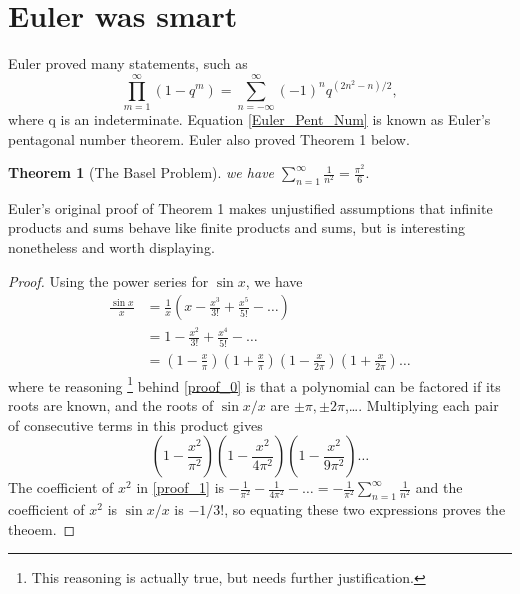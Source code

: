 \documentclass[10pt]{article}
\newtheorem{theorem}{Theorem}
\begin{document}
    \section{Euler was smart}
        Euler proved many statements, such as
        \begin{equation}
            \label{Euler_Pent_Num}
            \prod_{m=1}^{\infty}\left(1-q^m\right)=\sum_{n=-\infty}^{\infty}\left(-1\right)^n q^{\left(2n^2-n\right)/2},
        \end{equation}
        where q is an indeterminate. Equation \eqref{Euler_Pent_Num} is known as Euler's pentagonal number theorem.
        Euler also proved Theorem 1 below.
        \begin{theorem}[The Basel Problem]
            we have $\sum_{n=1}^{\infty}\frac{1}{n^2}=\frac{\pi^2}{6}.$
        \end{theorem}
        Euler’s original proof of Theorem 1 makes unjustified assumptions that infinite
        products and sums behave like finite products and sums, but is interesting
        nonetheless and worth displaying.
        \begin{proof}
            Using the power series for $\sin{x}$, we have
            \begin{align*}
                \frac{\sin x}{x} & = \frac{1}{x}\left(x - \frac{x^3}{3!}+\frac{x^5}{5!}-\ldots\right) \\
                                 & = 1 - \frac{x^2}{3!}+\frac{x^4}{5!}-\ldots \\
                                 \label{proof_0}
                                 \tag{2}
                                 & = \left(1-\frac{x}{\pi}\right) \left(1+\frac{x}{\pi}\right) \left(1-\frac{x}{2\pi}\right)\left(1+\frac{x}{2\pi}\right)\ldots
            \end{align*}
            where te reasoning \footnote{This reasoning is actually true, but needs further justification.}
            behind \eqref{proof_0} is that a polynomial can be factored if its roots
            are known, and the roots of $\sin x/x$ are $\pm\pi, \pm2\pi$,\ldots. Multiplying each pair
            of consecutive terms in this product gives
            \begin{equation*}
                \label{proof_1}
                \tag{3}
                \left(1-\frac{x^2}{\pi^2}\right) \left(1-\frac{x^2}{4\pi^2}\right) \left(1-\frac{x^2}{9\pi^2}\right)\ldots
            \end{equation*}
            The coefficient of $x^2$ in \eqref{proof_1} is $\displaystyle -\frac{1}{\pi^2}-\frac{1}{4\pi^2}-\ldots=-\frac{1}{\pi^2}\sum_{n=1}^{\infty}\frac{1}{n^2}$ and the
            coefficient of $x^2$ is $\sin x/x$ is $-1/3!$, so equating these two expressions proves the theoem.
        \end{proof}
\end{document}
